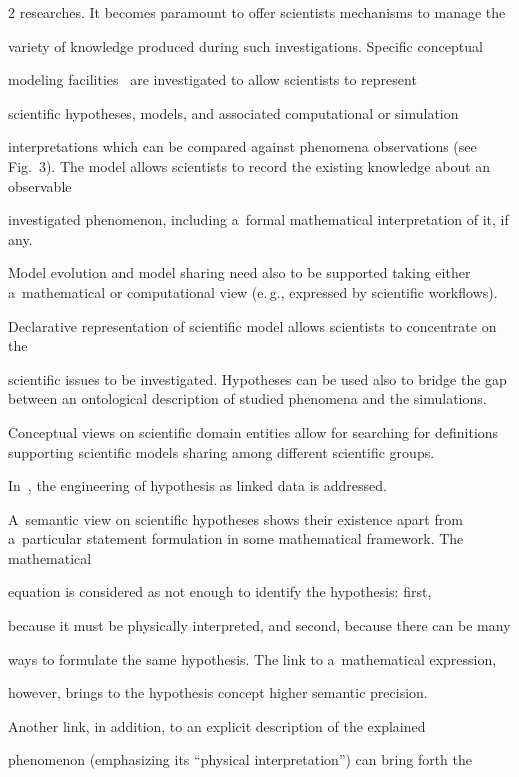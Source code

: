 \begin{multicols}{2}
researches. It becomes paramount to offer scientists mechanisms to manage the


variety of knowledge produced during such investigations. Specific conceptual


modeling facilities~\cite{43-kl} are investigated to allow scientists to represent


scientific hypotheses, models, and associated computational or simulation


interpretations which can be compared against phenomena observations (see Fig.~3). The model allows scientists to record the existing knowledge about an observable


investigated phenomenon, including a~formal mathematical interpretation of it, if any.


Model evolution and model sharing need also to be supported taking either a~mathematical or computational view (e.\,g., expressed by scientific workflows).


Declarative representation of scientific model allows scientists to concentrate on the


scientific issues to be investigated. Hypotheses can be used also to bridge the gap between an ontological description of studied phenomena and the simulations.


Conceptual views on scientific domain entities allow for searching for definitions supporting scientific models sharing among different scientific groups.





  In~\cite{11-kl}, the engineering of hypothesis as linked data is addressed.


A~semantic view on scientific hypotheses shows their existence apart from a~particular statement formulation in some mathematical framework. The mathematical


equation is considered as not enough to identify the hypothesis: first,


because it must be physically interpreted, and second, because there can be many


ways to formulate the  same hypothesis. The link to a~mathematical expression,


however, brings to the  hypothesis concept higher semantic precision.


Another link, in addition, to an explicit  description of the explained


phenomenon (emphasizing its ``physical interpretation'')  can bring forth the



\end{multicols}
